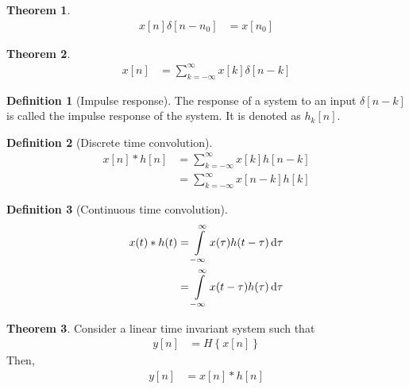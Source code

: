 \documentclass[titlepage, fleqn, a4paper, 12pt, twoside]{article}
\theoremstyle{definition}
\newtheorem{definition}{Definition}
\theoremstyle{theorem}
\newtheorem{theorem}{Theorem}
\begin{document}
\begin{theorem}
	\begin{align*}
		x[n] \delta[n - n_0] & = x[n_0]
	\end{align*}
\end{theorem}

\begin{theorem}
	\begin{align*}
		x[n] & = \sum\limits_{k = -\infty}^{\infty} x[k] \delta[n - k]
	\end{align*}
\end{theorem}

\begin{definition}[Impulse response]
	The response of a system to an input $\delta[n - k]$ is called the impulse response of the system.
	It is denoted as $h_k[n]$.
\end{definition}

\begin{definition}[Discrete time convolution]
	\begin{align*}
		x[n] \ast h[n] & = \sum\limits_{k = -\infty}^{\infty} x[k] h[n - k] \\
                               & = \sum\limits_{k = -\infty}^{\infty} x[n - k] h[k]
	\end{align*}
\end{definition}

\begin{definition}[Continuous time convolution]
	\begin{align*}
		x(t) \ast h(t) & = \int\limits_{-\infty}^{\infty} x(\tau) h(t - \tau) \dif \tau \\
                               & = \int\limits_{-\infty}^{\infty} x(t - \tau) h(\tau) \dif \tau
	\end{align*}
\end{definition}

\begin{theorem}
	Consider a linear time invariant system such that
	\begin{align*}
		y[n] & = H\left\{ x[n] \right\}
	\end{align*}
	Then,
	\begin{align*}
		y[n] & = x[n] \ast h[n]
	\end{align*}
\end{theorem}
\end{document}
